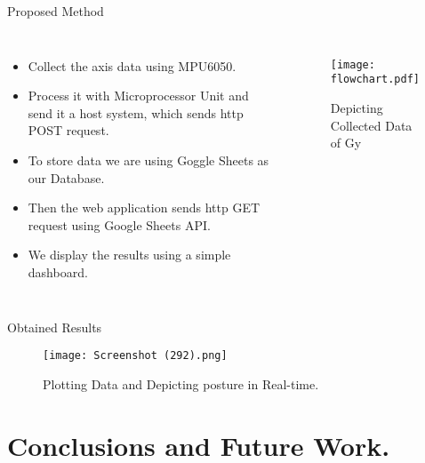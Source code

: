 \documentclass[aspectratio=169,xcolor=dvipsnames]{beamer}
\begin{document}
\begin{frame}{Proposed Method}

 \begin{columns}[c]
    \begin{itemize}
        \item Collect the axis data using MPU6050.
        \item Process it with Microprocessor Unit and send it a host system, which sends http POST request.
        \item To store data we are using Goggle Sheets as our Database.
        \item Then the web application sends http GET request using Google Sheets API.
        \item We display the results using a simple dashboard.
    \end{itemize}
    \begin{figure}
        \centering
            \texttt{[image: flowchart.pdf]}
            \caption{Depicting Collected Data of Gy}
            \label{fig:archi}
        \end{figure}
     \end{columns}
\end{frame}







\begin{frame}{Obtained Results}
    \begin{figure}
        \centering
        \texttt{[image: Screenshot (292).png]}
        \caption{Plotting Data and Depicting posture in Real-time.}
        \label{fig:results}
    \end{figure}
       
\end{frame}



\section{Conclusions and Future Work.}
\end{document}
